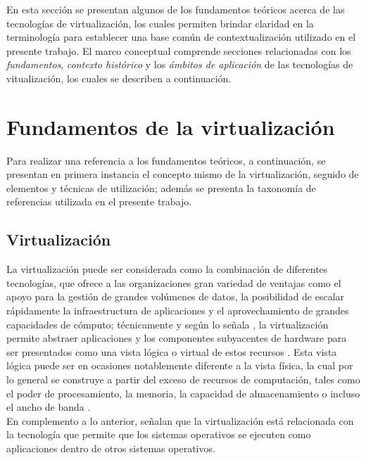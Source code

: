 En esta sección se presentan algunos de los fundamentos teóricos acerca de las tecnologías de virtualización, los cuales permiten brindar claridad en la terminología para establecer una base común de contextualización utilizado en el presente trabajo.  El marco conceptual comprende secciones relacionadas con los \textit{fundamentos}, \textit{contexto histórico} y los \textit{ámbitos de aplicación} de las tecnologías de vitualización, los cuales se describen a continuación.

\section{Fundamentos de la virtualización}\label{fundamentos}

Para realizar una referencia a los fundamentos teóricos, a continuación, se presentan en primera instancia el concepto mismo de la virtualización, seguido de elementos y técnicas de utilización; además se presenta la  taxonomía de referencias utilizada en el presente trabajo. 

\subsection{Virtualización}

La virtualización puede ser considerada como la combinación de diferentes tecnologías, que ofrece a las organizaciones gran variedad de ventajas como el apoyo para la gestión de grandes volúmenes de datos, la posibilidad de escalar rápidamente la infraestructura de aplicaciones y el aprovechamiento de grandes capacidades de cómputo; técnicamente y según lo señala \textcite{Kusnetzky2011}, la virtualización permite abstraer aplicaciones y los componentes subyacentes de hardware para ser presentados como una vista lógica o virtual de estos recursos \parencite{AbdElRahem2016}. Esta vista lógica puede ser en ocasiones notablemente diferente a la vista física, la cual por lo general se construye a partir del exceso de recursos de computación, tales como el poder de  procesamiento, la memoria, la capacidad de almacenamiento o incluso el ancho de banda \parencite{Stallings2015}.\\

En complemento a lo anterior, \textcite{Silberschatz2014} señalan que la virtualización está relacionada con la tecnología que permite que los sistemas operativos se ejecuten como aplicaciones dentro de otros sistemas operativos. \\

